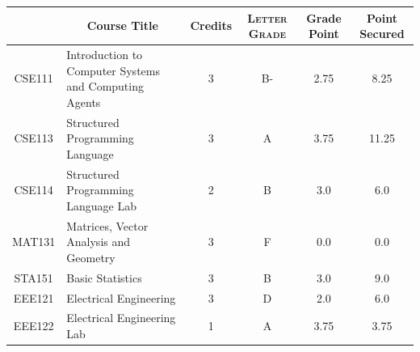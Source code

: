 \documentclass[11pt]{article}
\newcommand*{\numtwo}[1]{\pgfmathprintnumber[
                    fixed, precision=2, fixed zerofill=true]{#1}}
\begin{document}
                \begin{center}
                    \renewcommand{\arraystretch}{1.08}
                    
                \begin{tabular}{|c|l|c|>{\scshape}c|c|c|}
                \hline  \rule[-1ex]{0pt}{3.5ex} {\centering{\bf Course Code}} &  \multicolumn{1}{c|}{\textbf{Course Title}}  & {\bf Credits} & {\bf Letter Grade} & {\bf Grade Point} & {\bf Point Secured}  \\ 
                \hline   CSE111 &  Introduction to Computer Systems and Computing Agents		 & 3 & B- & 2.75 & 8.25 \\ %
                \hline   CSE113 &  Structured Programming Language		 & 3 & A & 3.75 & 11.25 \\ %
                \hline   CSE114 &  Structured Programming Language Lab		 & 2 & B & 3.0 & 6.0 \\ %
                \hline   MAT131 &  Matrices, Vector Analysis and Geometry		 & 3 & F & 0.0 & 0.0 \\ %
                \hline   STA151 &  Basic Statistics		 & 3 & B & 3.0 & 9.0 \\ %
                \hline   EEE121 &  Electrical Engineering		 & 3 & D & 2.0 & 6.0 \\ %
                \hline   EEE122 &  Electrical Engineering Lab		 & 1 & A & 3.75 & 3.75 \\ %

\hline                %
                \end{tabular}
                \end{center}
                \renewcommand{\arraystretch}{1.03}
\end{document}

